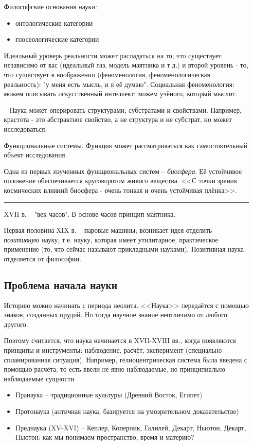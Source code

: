 \documentclass[a4paper,12pt]{article}
\begin{document}
Философские основания науки:
\begin{itemize}[noitemsep]
	\item онтологические категории
	\item гносеологические категории
\end{itemize}

Идеальный уроверь реальности может распадаться на то, что существует независимо от вас (идеальный газ, модель маятника и т.д.) и второй уровень - то, что существует в воображении (феноменология, феноменологическая реальность): "у меня есть мысль, и я её думаю". Социальная феноменология: можем описывать искусственный интеллект; можем учёного, который мыслит.

--
Наука может оперировать структурами, субстратами и свойствами. Например, крастота - это абстрактное свойство, а не структура и не субстрат, но может исследоваться.

Функциональные системы.
Функция может рассматриваться как самостоятельный объект исследования.

Одна из первых изученных функциональных систем -- \emph{биосфера}.
Её устойчивое положение обеспечивается круговоротом живого вещества.
<<С точки зрения космических влияний биосфера - очень тонкая и очень устойчивая плёнка>>.

\hrule

XVII в. -- "век часов".
В основе часов принцип маятника.

Первая половина XIX в. -- паровые машины; возникает идея отделить \emph{позитивную} науку, т.е. науку, которая имеет утилитарное, практическое применение (то, что сейчас называют прикладными науками).
Позитивная наука отделяется от философии.

\subsection{Проблема начала науки}

Историю можно начинать с периода неолита.
<<Наука>> передаётся с помощью знаков, созданных орудий.
Но тогда научное знание неотличимо от любого другого.

Поэтому считается, что наука начинается в XVII-XVIII вв., когда появляются принципы и инструменты: наблюдение, расчёт, эксперимент (специально спланированная ситуация).
Например, гелиоцентрическая система была введена с помощью расчёта, то есть ввели не явно наблюдаемые, но принципиально наблюдаемые сущности.

\begin{itemize}[noitemsep]
	\item Пранаука -- традиционные культуры (Древний Восток, Египет)
	\item Протонаука (античная наука, базируется на умозрительном доказательстве)
	\item Преднаука (XV-XVI) -- Кеплер, Коперник, Галилей, Декарт, Ньютон. Декарт, Ньютон: как мы понимаем пространство, время и материю?
\end{itemize}
\end{document}
